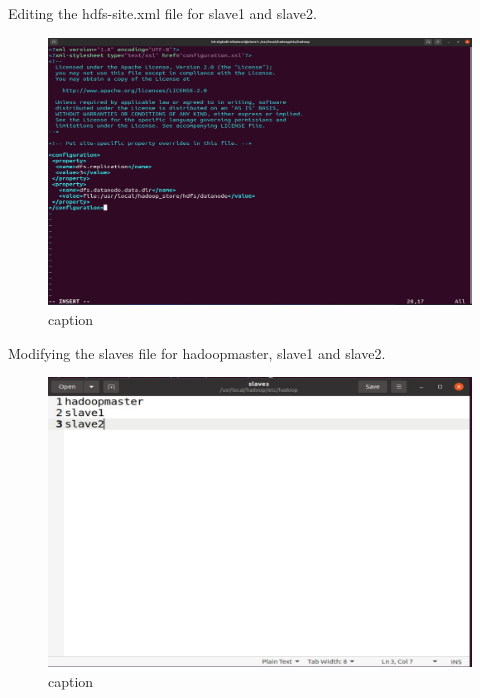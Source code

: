 \begin{spacing}{1.2}
\par Editing the hdfs-site.xml file for slave1 and slave2.
\\
\begin{figure}[!htb] 
\begin{center} 
\includegraphics[width=1\linewidth]{Big_Data/Hadoop/Multi-Nodes Cluster/Changing replication number.jpg} 
\end{center} 
\caption{caption} 
\end{figure} 
\FloatBarrier

\par Modifying the slaves file for hadoopmaster, slave1 and slave2.
\\
\begin{figure}[!htb] 
\begin{center} 
\includegraphics[width=1\linewidth]{Big_Data/Hadoop/Multi-Nodes Cluster/Editing slaves file.jpg} 
\end{center} 
\caption{caption} 
\end{figure} 
\FloatBarrier


\end{spacing}
